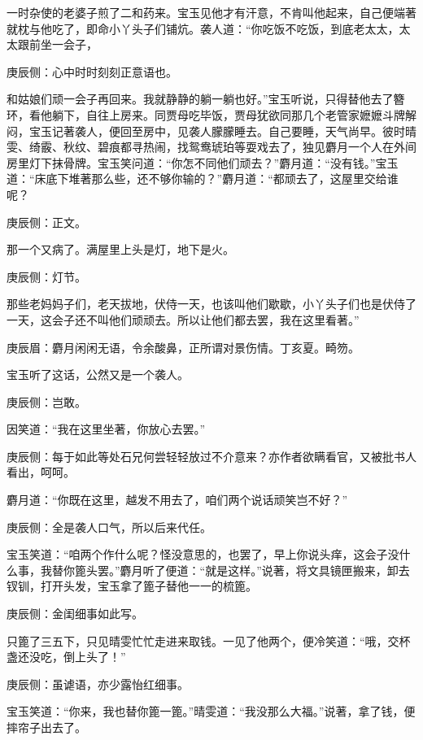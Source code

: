 \begin{parag}
    一时杂使的老婆子煎了二和药来。宝玉见他才有汗意，不肯叫他起来，自己便端著就枕与他吃了，即命小丫头子们铺炕。袭人道：“你吃饭不吃饭，到底老太太，太太跟前坐一会子，\begin{note}庚辰侧：心中时时刻刻正意语也。\end{note}和姑娘们顽一会子再回来。我就静静的躺一躺也好。”宝玉听说，只得替他去了簪环，看他躺下，自往上房来。同贾母吃毕饭，贾母犹欲同那几个老管家嬷嬷斗牌解闷，宝玉记著袭人，便回至房中，见袭人朦朦睡去。自己要睡，天气尚早。彼时晴雯、绮霰、秋纹、碧痕都寻热闹，找鸳鸯琥珀等耍戏去了，独见麝月一个人在外间房里灯下抹骨牌。宝玉笑问道：“你怎不同他们顽去？”麝月道：“没有钱。”宝玉道：“床底下堆著那么些，还不够你输的？”麝月道：“都顽去了，这屋里交给谁呢？\begin{note}庚辰侧：正文。\end{note}那一个又病了。满屋里上头是灯，地下是火。\begin{note}庚辰侧：灯节。\end{note}那些老妈妈子们，老天拔地，伏侍一天，也该叫他们歇歇，小丫头子们也是伏侍了一天，这会子还不叫他们顽顽去。所以让他们都去罢，我在这里看著。”\begin{note}庚辰眉：麝月闲闲无语，令余酸鼻，正所谓对景伤情。丁亥夏。畸笏。\end{note}
\end{parag}


\begin{parag}
    宝玉听了这话，公然又是一个袭人。\begin{note}庚辰侧：岂敢。\end{note}因笑道：“我在这里坐著，你放心去罢。”\begin{note}庚辰侧：每于如此等处石兄何尝轻轻放过不介意来？亦作者欲瞒看官，又被批书人看出，呵呵。\end{note}麝月道：“你既在这里，越发不用去了，咱们两个说话顽笑岂不好？”\begin{note}庚辰侧：全是袭人口气，所以后来代任。\end{note}宝玉笑道：“咱两个作什么呢？怪没意思的，也罢了，早上你说头痒，这会子没什么事，我替你篦头罢。”麝月听了便道：“就是这样。”说著，将文具镜匣搬来，卸去钗钏，打开头发，宝玉拿了篦子替他一一的梳篦。\begin{note}庚辰侧：金闺细事如此写。\end{note}只篦了三五下，只见晴雯忙忙走进来取钱。一见了他两个，便冷笑道：“哦，交杯盏还没吃，倒上头了！”\begin{note}庚辰侧：虽谑语，亦少露怡红细事。\end{note}宝玉笑道：“你来，我也替你篦一篦。”晴雯道：“我没那么大福。”说著，拿了钱，便摔帘子出去了。
\end{parag}


